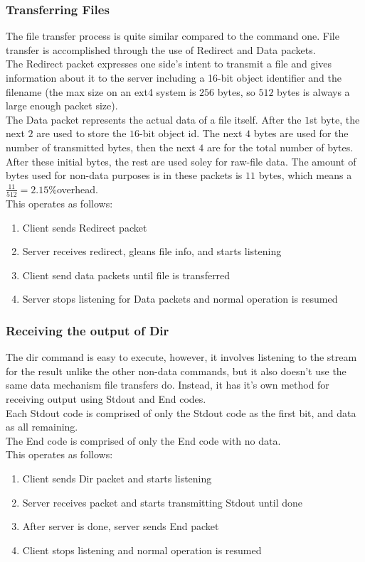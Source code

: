 \documentclass{article}
\begin{document}
\subsubsection{Transferring Files}
The file transfer process is quite similar compared to the command one. File transfer is accomplished through the use of Redirect and Data packets.\\
The Redirect packet expresses one side's intent to transmit a file and gives information about it to the server including a 16-bit object identifier and the filename (the max size on an ext4 system is $256$ bytes, so $512$ bytes is always a large enough packet size).\\
The Data packet represents the actual data of a file itself. After the $1$st byte, the next $2$ are used to store the $16$-bit object id. The next $4$ bytes are used for the number of transmitted bytes, then the next $4$ are for the total number of bytes. After these initial bytes, the rest are used soley for raw-file data. The amount of bytes used for non-data purposes is in these packets is $11$ bytes, which means a $\frac{11}{512}=2.15\%$overhead.\\
This operates as follows:
\begin{enumerate}
	\item Client sends Redirect packet
	\item Server receives redirect, gleans file info, and starts listening
	\item Client send data packets until file is transferred
	\item Server stops listening for Data packets and normal operation is resumed
\end{enumerate}

\subsubsection{Receiving the output of Dir}
The dir command is easy to execute, however, it involves listening to the stream for the result unlike the other non-data commands, but it also doesn't use the same data mechanism file transfers do. Instead, it has it's own method for receiving output using Stdout and End codes.\\
Each Stdout code is comprised of only the Stdout code as the first bit, and data as all remaining.\\
The End code is comprised of only the End code with no data.\\
This operates as follows:
\begin{enumerate}
	\item Client sends Dir packet and starts listening
	\item Server receives packet and starts transmitting Stdout until done
	\item After server is done, server sends End packet
	\item Client stops listening and normal operation is resumed
\end{enumerate}
\end{document}
